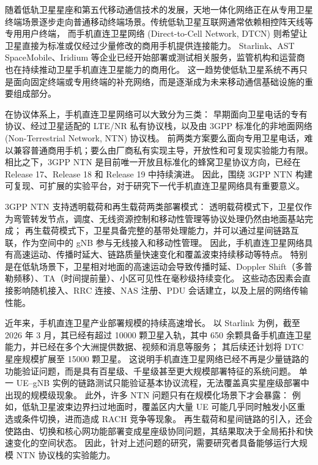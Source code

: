 



随着低轨卫星星座和第五代移动通信技术的发展，天地一体化网络正在从专用卫星终端场景逐步走向普通移动终端场景。传统低轨卫星互联网通常依赖相控阵天线等专用用户终端，
而手机直连卫星网络 (Direct-to-Cell Network, DTCN) 则希望让卫星直接为标准或仅经过少量修改的商用手机提供连接能力。
Starlink、AST SpaceMobile、Iridium 等企业已经开始部署或测试相关服务，监管机构和运营商也在持续推动卫星手机直连卫星能力的商用化\cite{starlinkMobile,astSpaceMobile,iridiumNtnDirect}。
这一趋势使低轨卫星系统不再只是面向固定终端或专用终端的补充网络，而是逐渐成为未来移动通信基础设施的重要组成部分。

在协议体系上，手机直连卫星网络可以大致分为三类：
早期面向卫星电话的专有协议、经过卫星适配的 LTE/NR 私有协议栈，以及由 3GPP 标准化的非地面网络 (Non-Terrestrial Network, NTN) 协议栈。
前两类方案要么面向专用卫星电话，难以兼容普通商用手机；要么由厂商私有实现主导，开放性和可复现实验能力有限。
相比之下，3GPP NTN 是目前唯一开放且标准化的蜂窝卫星协议方向，已经在 Release 17、Release 18 和 Release 19 中持续演进\cite{3gppNtn,threegppRel17,threegppRel18,threegppRel19}。
因此，围绕 3GPP NTN 构建可复现、可扩展的实验平台，对于研究下一代手机直连卫星网络具有重要意义。

3GPP NTN 支持透明载荷和再生载荷两类部署模式：
透明载荷模式下，卫星仅作为弯管转发节点，调度、无线资源控制和移动性管理等协议处理仍然由地面基站完成；
再生载荷模式下，卫星具备完整的基带处理能力，并可以通过星间链路互联，作为空间中的 gNB 参与无线接入和移动性管理。
因此，手机直连卫星网络具有高速运动、传播时延大、链路质量快速变化和覆盖波束持续移动等特点。
特别是在低轨场景下，卫星相对地面的高速运动会导致传播时延、Doppler Shift（多普勒频移）、TA（时间提前量）、小区可见性在毫秒级持续变化。
这些动态因素会直接影响随机接入、RRC 连接、NAS 注册、PDU 会话建立，以及上层的网络传输性能。


近年来，手机直连卫星产业部署规模的持续高速增长。
以 Starlink 为例，截至 2026 年 3 月，其已经有超过 10000 颗卫星入轨，其中 650 余颗具备手机直连卫星能力，并已经在多个大洲提供数据、视频和消息等服务；
其后续还计划将 DTC 星座规模扩展至 15000 颗卫星\cite{starlinkMobile,starlinkDtcScale}。
这说明手机直连卫星网络已经不再是少量链路的功能验证问题，而是具有百星级、千星级甚至更大规模部署特征的系统问题。
单一 UE--gNB 实例的链路测试只能验证基本协议流程，无法覆盖真实星座级部署中出现的规模级现象。
此外，许多 NTN 问题只有在规模化场景下才会暴露：
例如，低轨卫星波束边界扫过地面时，覆盖区内大量 UE 可能几乎同时触发小区重选或条件切换，进而造成 RACH 竞争等现象。
再生载荷和星间链路的引入，还会使路由、切换和核心网功能部署变成星座级协同问题，其结果取决于全局拓扑和快速变化的空间状态。
因此，针对上述问题的研究，需要研究者具备能够运行大规模 NTN 协议栈的实验能力。

